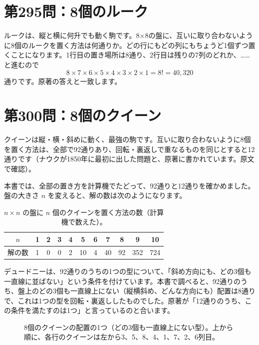 \documentclass[a4paper,11pt,openany]{ltjsbook}
\begin{document}
\section{第295問：8個のルーク}

ルークは、縦と横に何升でも動く駒です。8×8の盤に、互いに取り合わないように8個のルークを置く方法は何通りか。どの行にもどの列にもちょうど1個ずつ置くことになります。1行目の置き場所は8通り、2行目は残りの7列のどれか、……と進むので
\[
8\times7\times6\times5\times4\times3\times2\times1=8!=40{,}320
\]
通りです。原著の答えと一致します。

\section{第300問：8個のクイーン}

クイーンは縦・横・斜めに動く、最強の駒です。互いに取り合わないように8個を置く方法は、全部で92通りあり、回転・裏返しで重なるものを同じとすると12通りです（ナウクが1850年に最初に出した問題と、原著に書かれています。原文で確認）。

本書では、全部の置き方を計算機でたどって、92通りと12通りを確かめました。盤の大きさ $n$ を変えると、解の数は次のようになります。

\begin{table}[htbp]
\centering
\begin{tabular}{c|cccccccccc}
\toprule
$n$ & 1 & 2 & 3 & 4 & 5 & 6 & 7 & 8 & 9 & 10\\
\midrule
解の数 & 1 & 0 & 0 & 2 & 10 & 4 & 40 & 92 & 352 & 724\\
\bottomrule
\end{tabular}
\caption{$n\times n$ の盤に $n$ 個のクイーンを置く方法の数（計算機で数えた）。}
\end{table}

デュードニーは、92通りのうちの1つの型について、「斜め方向にも、どの3個も一直線に並ばない」という条件を付けています。本書で調べると、92通りのうち、盤上のどの3個も一直線上にない（縦横斜め、どんな方向にも）配置は8通りで、これは1つの型を回転・裏返ししたものでした。原著が「12通りのうち、この条件を満たすのは1つ」と言っているのと合います。

\begin{figure}[htbp]
\centering
{}
\caption{8個のクイーンの配置の1つ（どの3個も一直線上にない型）。上から順に、各行のクイーンは左から3、5、8、4、1、7、2、6列目。}
\end{figure}
\end{document}
